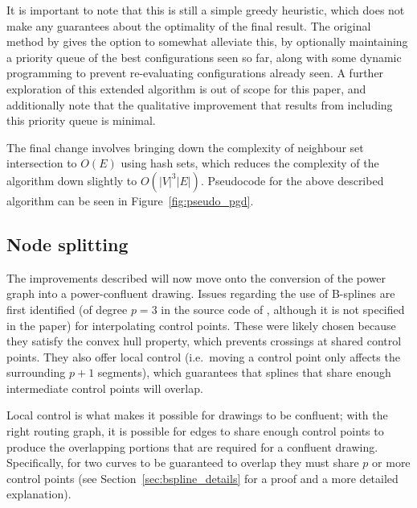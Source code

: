 It is important to note that this is still a simple greedy heuristic, which does not make any guarantees about the optimality of the final result.
The original method by \citet{Dwyer2014} gives the option to somewhat alleviate this, by optionally maintaining a priority queue of the best configurations seen so far, along with some dynamic programming to prevent re-evaluating configurations already seen.
A further exploration of this extended algorithm is out of scope for this paper, and \citet{Dwyer2014} additionally note that the qualitative improvement that results from including this priority queue is minimal.

The final change involves bringing down the complexity of neighbour set intersection to $O(E)$ using hash sets, which reduces the complexity of the algorithm down slightly to $O(|V|^3|E|)$.
Pseudocode for the above described algorithm can be seen in Figure~\ref{fig:pseudo_pgd}.

\subsection{Node splitting}
\label{sec:node_split}
The improvements described will now move onto the conversion of the power graph into a power-confluent drawing. Issues regarding the use of B-splines are first identified (of degree $p=3$ in the source code of \citet{Bach2017}, although it is not specified in the paper) for interpolating control points.
These were likely chosen because they satisfy the convex hull property, which prevents crossings at shared control points. They also offer local control (i.e.\ moving a control point only affects the surrounding $p+1$ segments), which guarantees that splines that share enough intermediate control points will overlap.

Local control is what makes it possible for drawings to be confluent; with the right routing graph, it is possible for edges to share enough control points to produce the overlapping portions that are required for a confluent drawing. Specifically, for two curves to be guaranteed to overlap they must share $p$ or more control points (see Section~\ref{sec:bspline_details} for a proof and a more detailed explanation).

